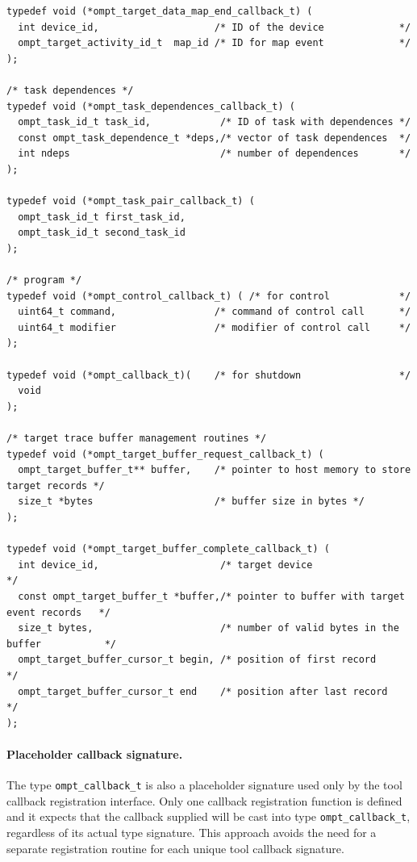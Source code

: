 \documentclass{article}
\begin{document}
{\begin{verbatim}
typedef void (*ompt_target_data_map_end_callback_t) (
  int device_id,                    /* ID of the device             */
  ompt_target_activity_id_t  map_id /* ID for map event             */
);

/* task dependences */
typedef void (*ompt_task_dependences_callback_t) (                                   
  ompt_task_id_t task_id,            /* ID of task with dependences */
  const ompt_task_dependence_t *deps,/* vector of task dependences  */
  int ndeps                          /* number of dependences       */
);

typedef void (*ompt_task_pair_callback_t) (
  ompt_task_id_t first_task_id,
  ompt_task_id_t second_task_id
);
        
/* program */						   
typedef void (*ompt_control_callback_t) ( /* for control            */	   
  uint64_t command,                 /* command of control call      */
  uint64_t modifier                 /* modifier of control call     */
);
  
typedef void (*ompt_callback_t)(    /* for shutdown                 */
  void
); 

/* target trace buffer management routines */
typedef void (*ompt_target_buffer_request_callback_t) (
  ompt_target_buffer_t** buffer,    /* pointer to host memory to store target records */
  size_t *bytes                     /* buffer size in bytes */
);
  
typedef void (*ompt_target_buffer_complete_callback_t) (
  int device_id,                     /* target device                                 */
  const ompt_target_buffer_t *buffer,/* pointer to buffer with target event records   */
  size_t bytes,                      /* number of valid bytes in the buffer           */
  ompt_target_buffer_cursor_t begin, /* position of first record                      */
  ompt_target_buffer_cursor_t end    /* position after last record                    */ 
);
\end{verbatim}

\paragraph{Placeholder callback signature.} The type \verb|ompt_callback_t| is also a placeholder signature used only by the tool callback registration interface. 
Only one callback registration function is defined and it expects that the callback supplied will be cast into type \verb|ompt_callback_t|, regardless of its actual type signature. This approach avoids the need for a separate registration routine for each unique tool callback signature. 

}
\end{document}
